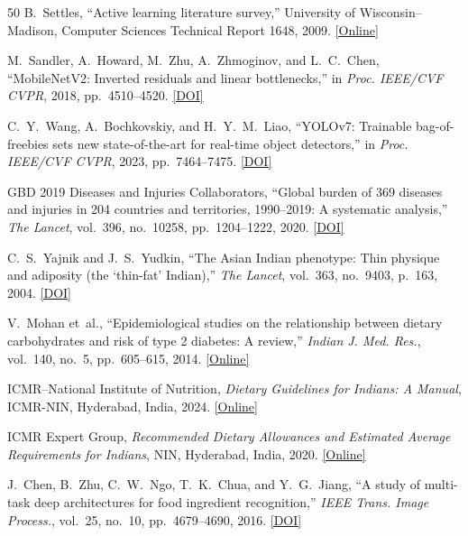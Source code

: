 \documentclass[conference]{IEEEtran}
\begin{document}
\begin{thebibliography}{50}
 B.~Settles, ``Active learning literature survey,'' University of Wisconsin--Madison, Computer Sciences Technical Report 1648, 2009. \href{https://minds.wisconsin.edu/handle/1793/60660}{[Online]}

 M.~Sandler, A.~Howard, M.~Zhu, A.~Zhmoginov, and L.~C.~Chen, ``MobileNetV2: Inverted residuals and linear bottlenecks,'' in \emph{Proc. IEEE/CVF CVPR}, 2018, pp.~4510--4520. \href{https://doi.org/10.1109/CVPR.2018.00474}{[DOI]}

 C.~Y.~Wang, A.~Bochkovskiy, and H.~Y.~M.~Liao, ``YOLOv7: Trainable bag-of-freebies sets new state-of-the-art for real-time object detectors,'' in \emph{Proc. IEEE/CVF CVPR}, 2023, pp.~7464--7475. \href{https://doi.org/10.1109/CVPR52729.2023.00721}{[DOI]}

 GBD 2019 Diseases and Injuries Collaborators, ``Global burden of 369 diseases and injuries in 204 countries and territories, 1990--2019: A systematic analysis,'' \emph{The Lancet}, vol.~396, no.~10258, pp.~1204--1222, 2020. \href{https://doi.org/10.1016/S0140-6736(20)30925-9}{[DOI]}

 C.~S.~Yajnik and J.~S.~Yudkin, ``The Asian Indian phenotype: Thin physique and adiposity (the `thin-fat' Indian),'' \emph{The Lancet}, vol.~363, no.~9403, p.~163, 2004. \href{https://doi.org/10.1016/S0140-6736(03)15291-7}{[DOI]}

 V.~Mohan et~al., ``Epidemiological studies on the relationship between dietary carbohydrates and risk of type 2 diabetes: A review,'' \emph{Indian J. Med. Res.}, vol.~140, no.~5, pp.~605--615, 2014. \href{https://www.ncbi.nlm.nih.gov/pmc/articles/PMC4311314/}{[Online]}

 ICMR--National Institute of Nutrition, \emph{Dietary Guidelines for Indians: A Manual}, ICMR-NIN, Hyderabad, India, 2024. \href{https://www.nin.res.in/dietaryguidelines/DGI2024.pdf}{[Online]}

 ICMR Expert Group, \emph{Recommended Dietary Allowances and Estimated Average Requirements for Indians}, NIN, Hyderabad, India, 2020. \href{https://www.nin.res.in/downloads/RDA_2020_Report.pdf}{[Online]}

 J.~Chen, B.~Zhu, C.~W.~Ngo, T.~K.~Chua, and Y.~G.~Jiang, ``A study of multi-task deep architectures for food ingredient recognition,'' \emph{IEEE Trans. Image Process.}, vol.~25, no.~10, pp.~4679--4690, 2016. \href{https://doi.org/10.1109/TIP.2016.2598684}{[DOI]}


\end{thebibliography}
\end{document}
